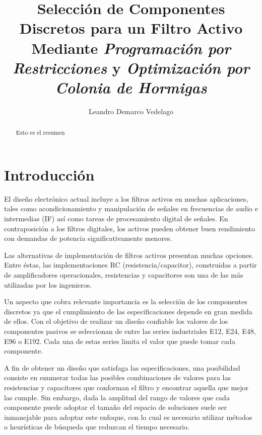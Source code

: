 \documentclass{llncs}
\title{Selección de Componentes Discretos para un Filtro Activo Mediante
  \textit{Programación por Restricciones} y \textit{Optimización por Colonia de Hormigas}}
\author{Leandro Demarco Vedelago}
\institute{
            \email{leandrodemarco@gmail.com}\\
            Universidad Nacional de Córdoba, Fa.M.A.F
          }
\begin{document}
{\def\addcontentsline#1#2#3{}\maketitle
  \noindent
  }
  
\begin{abstract}
  Esto es el resumen 
\end{abstract}

\tableofcontents
\newpage
  \section{\textbf{Introducción}}
    \label{sec:motivacion}
    El dise\~no electrónico actual incluye a los filtros activos en muchas aplicaciones,
    tales como acondicionamiento y manipulación de se\~nales en frecuencias de audio e
    intermedias (IF) así como tareas de procesamiento digital de se\~nales. En
    contraposición a los filtros digitales, los activos pueden obtener buen rendimiento
    con demandas de potencia significativamente menores.
    
    Las alternativas de implementación de filtros activos presentan muchas opciones.
    Entre éstas, las implementaciones RC (resistencia/capacitor), construidas a partir de
    amplificadores operacionales, resistencias y capacitores son una de las más utilizadas
    por los ingenieros.\cite{corr}
    
    Un aspecto que cobra relevante importancia es la selección de los componentes discretos
    ya que el cumplimiento de las especificaciones depende en gran medida de ellos. Con el
    objetivo de realizar un diseño confiable los valores de los componentes pasivos se
    seleccionan de entre las series industriales E12, E24, E48, E96 o E192. Cada una de estas
    series limita el valor que puede tomar cada componente.
    
    A fin de obtener un diseño que satisfaga las especificaciones,  una posibilidad consiste 
    en enumerar todas las posibles combinaciones de valores para las resistencias y 
    capacitores que conforman el filtro y encontrar aquella que mejor las cumple. Sin embargo,
    dada la amplitud del rango de valores que cada componente puede adoptar el tamaño del
    espacio de soluciones suele ser inmanejable para adoptar este enfoque, con
    lo cual es necesario utilizar métodos o heurísticas de búsqueda que reduzcan el tiempo
    necesario.
    
\end{document}
